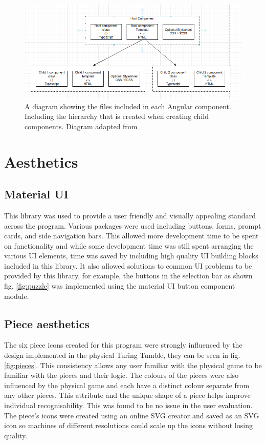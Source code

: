 \documentclass{l4proj}
\begin{document}
\begin{figure}
    \centering
    \includegraphics[width=1\linewidth]{images/componentDesign.png}
    \caption{A diagram showing the files included in each Angular component. Including the hierarchy that is created when creating child components. Diagram adapted from \cite{noauthor_angular_nodate-2}}
    \label{fig:angularComp}
\end{figure}


\section{Aesthetics}
\subsection{Material UI}
This library was used to provide a user friendly and visually appealing standard across the program. Various packages were used including buttons, forms, prompt cards, and side navigation bars. This allowed more development time to be spent on functionality and while some development time was still spent arranging the various UI elements, time was saved by including high quality UI building blocks included in this library. It also allowed solutions to common UI problems to be provided by this library, for example, the buttons in the selection bar as shown fig. \ref{fig:puzzle} was implemented using the material UI button component module.

\subsection{Piece aesthetics}
The six piece icons created for this program were strongly influenced by the design implemented in the physical Turing Tumble, they can be seen in fig. \ref{fig:pieces}. This consistency allows any user familiar with the physical game to be familiar with the pieces and their logic. The colours of the pieces were also influenced by the physical game and each have a distinct colour separate from any other pieces. This attribute and the unique shape of a piece helps improve individual recognisability. This was found to be no issue in the user evaluation. The piece's icons were created using an online SVG creator \citep{noauthor_method_nodate} and saved as an SVG icon so machines of different resolutions could scale up the icons without losing quality. 
\end{document}
